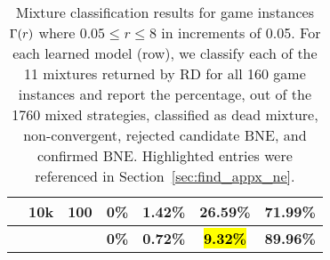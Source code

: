 \begin{table}[ht]
\begin{tabular}{c|c|c|c|c|c|c}
                             & 10k                       & 100                  & 0\%           & 1.42\%           & 26.59\%          & 71.99\%          \\
\hline
                             & \multicolumn{1}{l}{}      & \multicolumn{1}{l}{} & \textbf{0\%}  & \textbf{0.72\%}  & \hl{\textbf{9.32\%}}  & \textbf{89.96\%}
\end{tabular}
\caption{Mixture classification results for game instances $\Gamma(r)$ where $0.05 \leq r \leq 8$ in increments of 0.05.
For each learned model (row), we classify each of the 11 mixtures returned by RD for all 160 game instances and report the percentage, out of the 1760 mixed strategies, classified as dead mixture, non-convergent, rejected candidate BNE, and confirmed BNE.
Highlighted entries were referenced in Section~\ref{sec:find_appx_ne}.}
\label{table:game1_mix_class_rleq8}
\end{table}